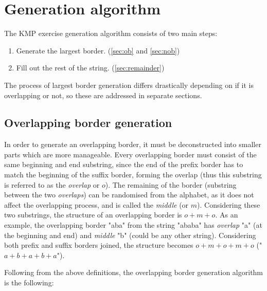 \documentclass{l4proj}
\begin{document}
\section{Generation algorithm}
\label{sec:kgen}

The KMP exercise generation algorithm consists of two main steps:
\begin{enumerate}
	\item
	Generate the largest border. (\autoref{sec:ob} and \autoref{sec:nob})
	\item
	Fill out the rest of the string. (\autoref{sec:remainder})
\end{enumerate}

The process of largest border generation differs drastically depending on if it is overlapping or not, so these are addressed in separate sections.

\subsection{Overlapping border generation}
\label{sec:ob}

In order to generate an overlapping border, it must be deconstructed into smaller parts which are more manageable. Every overlapping border must consist of the same beginning and end substring, since the end of the prefix border has to match the beginning of the suffix border, forming the overlap (thus this substring is referred to as the \emph{overlap} or $o$). The remaining of the border (substring between the two \emph{overlaps}) can be randomised from the alphabet, as it does not affect the overlapping process, and is called the \emph{middle} (or $m$). Considering these two substrings, the structure of an overlapping border is $o+m+o$. As an example, the overlapping border "aba" from the string "ababa" has \emph{overlap} "a" (at the beginning and end) and \emph{middle} "b" (could be any other string). Considering both prefix and suffix borders joined, the structure becomes $o+m+o+m+o$ ("$a+b+a+b+a$").

Following from the above definitions, the overlapping border generation algorithm is the following:
\end{document}
